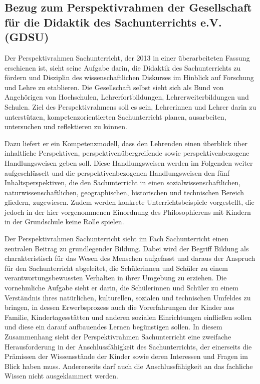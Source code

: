 \newpage
\subsection{Bezug zum Perspektivrahmen der Gesellschaft für die Didaktik des Sachunterrichts  e.V. (GDSU)}

Der Perspektivrahmen Sachunterricht, der 2013 in einer überarbeiteten Fassung erschienen ist, sieht seine Aufgabe darin, die Didaktik des Sachunterrichts zu fördern und Disziplin des wissenschaftlichen Diskurses im Hinblick auf Forschung und Lehre zu etablieren. 
Die Gesellschaft selbst sieht sich als Bund von Angehörigen von Hochschulen, Lehrerfortbildungen, Lehrerweiterbildungen und Schulen. 
Ziel des Perspektivrahmens soll es sein, Lehrerinnen und Lehrer darin zu unterstützen, kompetenzorientierten Sachunterricht planen, ausarbeiten, untersuchen und reflektieren zu können.

Dazu liefert er ein Kompetenzmodell, dass den Lehrenden einen überblick über inhaltliche Perspektiven, perspektivenübergreifende sowie perspektivenbezogene Handlungsweisen geben soll. 
Diese Handlungsweisen werden im Folgenden weiter aufgeschlüsselt und die perspektivenbezogenen Handlungsweisen den fünf Inhaltsperspektiven, die den Sachunterricht in einen sozialwissenschaftlichen, naturwissenschaftlichen, geographischen, historischen und technischen Bereich gliedern, zugewiesen\cite[S.\,5f]{GDS13}.
 Zudem werden konkrete Unterrichtsbeispiele vorgestellt, die jedoch in der hier vorgenommenen Einordnung des Philosophierens mit Kindern in der Grundschule keine Rolle spielen.
 
Der Perspektivrahmen Sachunterricht sieht im Fach Sachunterricht einen \glqq zentralen Beitrag zu grundlegender Bildung\grqq{}\cite[S.\,9]{GDS13}.
Dabei wird der Begriff Bildung als charakteristisch für das Wesen des Menschen aufgefasst und daraus der Anspruch für den Sachunterricht abgeleitet, die Schülerinnen und Schüler zu einem verantwortungsbewussten Verhalten in ihrer Umgebung zu erziehen. 
Die vornehmliche Aufgabe sieht er darin, die Schülerinnen und Schüler zu einem Verständnis ihres natürlichen, kulturellen, sozialen und technischen Umfeldes zu bringen, in dessen Erwerbsprozess auch die Vorerfahrungen der Kinder aus Familie, Kindertagesstätten und anderen sozialen Einrichtungen einfließen sollen und diese ein darauf aufbauendes Lernen begünstigen sollen. 
In diesem Zusammenhang sieht der Perspektivrahmen Sachunterricht eine zweifache Herausforderung in der Anschlussfähigkeit des Sachunterrichts, der einerseits die Prämissen der Wissensstände der Kinder sowie deren Interessen und Fragen im Blick haben muss. 
Andererseits darf auch die Anschlussfähigkeit an das fachliche Wissen nicht ausgeklammert werden. 

